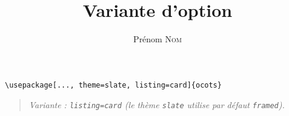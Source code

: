 \documentclass[11pt]{ocots-book}
\title{Variante d'option}
\author{Prénom \textsc{Nom}}
\newcommand{\ocotsvariantnote}[1]{\begin{quote}\itshape Variante : #1\end{quote}}
\begin{document}
\maketitle

\begin{lstlisting}
\usepackage[..., theme=slate, listing=card]{ocots}
\end{lstlisting}
\ocotsvariantnote{\texttt{listing=card} (le th\`eme \texttt{slate} utilise par d\'efaut \texttt{framed}).}

\end{document}
